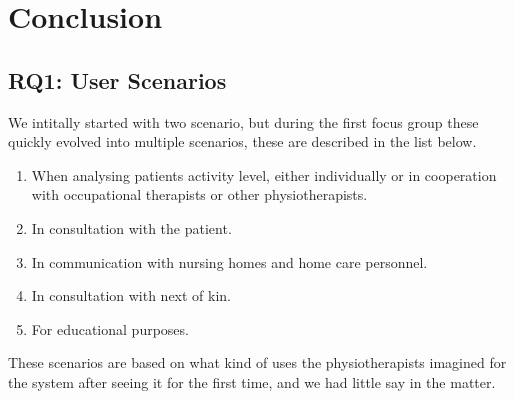 \chapter{Conclusion}

\section{RQ1: User Scenarios}
We intitally started with two scenario, but during the first focus group these quickly evolved into multiple scenarios, these are described in the list below.

\begin{enumerate}[itemsep=0cm, parsep=0cm]
\item When analysing patients activity level, either individually or in cooperation with occupational therapists or other physiotherapists.
\item In consultation with the patient.
\item In communication with nursing homes and home care personnel.
\item In consultation with next of kin.
\item For educational purposes.
\end{enumerate}

These scenarios are based on what kind of uses the physiotherapists imagined for the system after seeing it for the first time, and we had little say in the matter.

